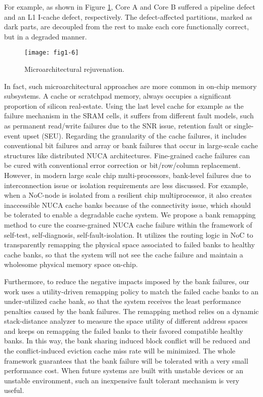 For example, as shown in Figure \ref{fig:microarch-repair}, Core A and Core B suffered a pipeline defect and an L1 I-cache defect, respectively. The defect-affected partitions, marked as dark parts, are decoupled from the rest to make each core functionally correct, but in a degraded manner.

\begin{figure}[t]
\centering
\texttt{[image: fig1-6]}
\caption{Microarchitectural rejuvenation.}
\label{fig:microarch-repair} 
\end{figure}

In fact, such microarchitectural approaches are more common in on-chip memory subsystems. A cache or scratchpad memory, always occupies a significant proportion of silicon real-estate. Using the last level cache for example as the failure mechanism in the SRAM cells, it suffers from different fault models, such as permanent read/write failures due to the SNR issue, retention fault or single-event upset (SEU). Regarding the granularity of the cache failures, it includes conventional bit failures and array or bank failures that occur in large-scale cache structures like distributed NUCA architectures. Fine-grained cache failures can be cured with conventional error correction or bit/row/column replacement. However, in modern large scale chip multi-processors, bank-level failures due to interconnection issue or isolation requirements are less discussed. For example, when a NoC-node is isolated from a resilient chip multiprocessor, it also creates inaccessible NUCA cache banks because of the connectivity issue, which should be tolerated to enable a degradable cache system. We propose a bank remapping method to cure the coarse-grained NUCA cache failure within the framework of self-test, self-diagnosis, self-fault-isolation. It utilizes the routing logic in NoC to transparently remapping the physical space associated to failed banks to healthy cache banks, so that the system will not see the cache failure and maintain a wholesome physical memory space on-chip. 

Furthermore, to reduce the negative impacts imposed by the bank failures, our work uses a utility-driven remapping policy to match the failed cache banks to an under-utilized cache bank, so that the system receives the least performance penalties caused by the bank failures. The remapping method relies on a dynamic stack-distance analyzer to measure the space utility of different address spaces and keeps on remapping the failed banks to their favored compatible healthy banks. In this way, the bank sharing induced block conflict will be reduced and the conflict-induced eviction cache miss rate will be minimized. The whole framework guarantees that the bank failure will be tolerated with a very small performance cost. When future systems are built with unstable devices or an unstable environment, such an inexpensive fault tolerant mechanism is very useful.

